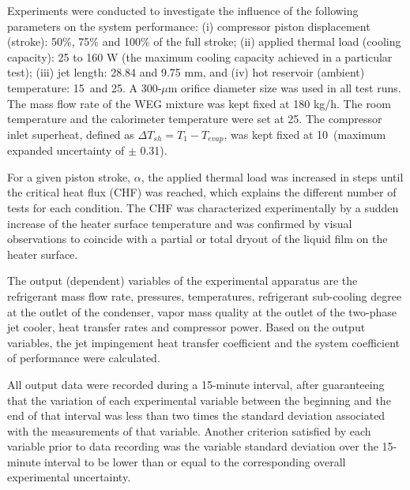 \documentclass[review,preprint,12pt]{elsarticle}
\begin{document}
Experiments were conducted to investigate the influence of the following parameters on the system performance: (i) compressor piston displacement (stroke): 50\%, 75\% and 100\% of the full stroke; (ii) applied thermal load (cooling capacity): 25 to 160 W (the maximum cooling capacity achieved in a particular test); (iii) jet length: 28.84 and 9.75 mm, and (iv) hot reservoir (ambient) temperature: 15\textcelsius\ and 25\textcelsius. A 300-$\mu$m orifice diameter size was used in all test runs. The mass flow rate of the WEG mixture was kept fixed at 180 kg/h. The room temperature and the calorimeter temperature were set at 25\textcelsius. The compressor inlet superheat, defined as $\Delta T_{sh} = T_{1} - T_{evap}$, was kept fixed at 10\textcelsius\ (maximum expanded uncertainty of $\pm$ 0.31\textcelsius). 

%
%

For a given piston stroke, $\alpha$, the applied thermal load was increased in steps until the critical heat flux (CHF) was reached, which explains the different number of tests for each condition. The CHF was characterized experimentally by a sudden increase of the heater surface temperature and was confirmed by visual observations to coincide with a partial or total dryout of the liquid film on the heater surface. 

%
%

The output (dependent) variables of the experimental apparatus are the refrigerant mass flow rate, pressures, temperatures, refrigerant sub-cooling degree at the outlet of the condenser, vapor mass quality at the outlet of the two-phase jet cooler, heat transfer rates and compressor power. Based on the output variables, the jet impingement heat transfer coefficient and the system coefficient of performance were calculated. 

All output data were recorded during a 15-minute interval, after guaranteeing that the variation of each experimental variable between the beginning and the end of that interval was less than two times the standard deviation associated with the measurements of that variable. Another criterion satisfied by each variable prior to data recording was the variable standard deviation over the 15-minute interval to be lower than or equal to the corresponding overall experimental uncertainty.
\end{document}
